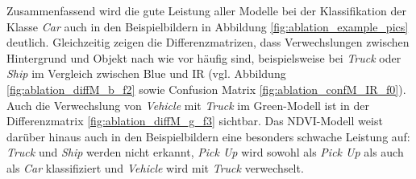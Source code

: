 Zusammenfassend wird die gute Leistung aller Modelle bei der Klassifikation der Klasse \textit{Car} auch in den Beispielbildern in Abbildung \ref{fig:ablation_example_pics} deutlich. Gleichzeitig zeigen die Differenzmatrizen, dass Verwechslungen zwischen Hintergrund und Objekt nach wie vor häufig sind, beispielsweise bei \textit{Truck} oder \textit{Ship} im Vergleich zwischen Blue und IR (vgl. Abbildung \ref{fig:ablation_diffM_b_f2} sowie Confusion Matrix \ref{fig:ablation_confM_IR_f0}). Auch die Verwechslung von \textit{Vehicle} mit \textit{Truck} im Green-Modell ist in der Differenzmatrix \ref{fig:ablation_diffM_g_f3} sichtbar. Das NDVI-Modell weist darüber hinaus auch in den Beispielbildern eine besonders schwache Leistung auf: \textit{Truck} und \textit{Ship} werden nicht erkannt, \textit{Pick Up} wird sowohl als \textit{Pick Up} als auch als \textit{Car} klassifiziert und \textit{Vehicle} wird mit \textit{Truck} verwechselt.  

